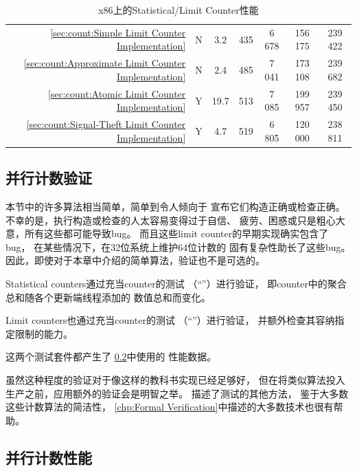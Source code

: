 \begin{table}
{\begin{tabular}{lrcS[table-format=2.1]S[table-format=3.0]S[table-format=4.0]
		  S[table-format=6.0]S[table-format=6.0]}
	 & \ref{sec:count:Simple Limit Counter Implementation} &
		N &  3.2 & 435 & 6 678 & 156 175 & 239 422 \\
	 & \ref{sec:count:Approximate Limit Counter Implementation} &
		N &  2.4 & 485 & 7 041 & 173 108 & 239 682 \\
	 & \ref{sec:count:Atomic Limit Counter Implementation} &
		Y & 19.7 & 513 & 7 085 & 199 957 & 239 450 \\
	 & \ref{sec:count:Signal-Theft Limit Counter Implementation} &
		Y &  4.7 & 519 & 6 805 & 120 000 & 238 811 \\
	\bottomrule
\end{tabular}
}
\caption{x86上的Statistical/Limit Counter性能}
\label{tab:count:Statistical/Limit Counter Performance on x86}
\end{table}

\subsection{并行计数验证}
\label{sec:count:Parallel Counting Validation}

本节中的许多算法相当简单，简单到令人倾向于
宣布它们构造正确或检查正确。
不幸的是，执行构造或检查的人太容易变得过于自信、
疲劳、困惑或只是粗心大意，所有这些都可能导致bug。
而且这些limit counter的早期实现确实包含了bug，
在某些情况下，在32位系统上维护64位计数的
固有复杂性助长了这些bug。
因此，即使对于本章中介绍的简单算法，验证也不是可选的。

Statistical counters通过充当counter的测试
（``''）进行验证，
即counter中的聚合总和随各个更新端线程添加的
数值总和而变化。

Limit counters也通过充当counter的测试
（``''）进行验证，
并额外检查其容纳指定限制的能力。

这两个测试套件都产生了
\cref{sec:count:Parallel Counting Performance}中使用的
性能数据。

虽然这种程度的验证对于像这样的教科书实现已经足够好，
但在将类似算法投入生产之前，应用额外的验证会是明智之举。
描述了测试的其他方法，
鉴于大多数这些计数算法的简洁性，
\cref{chp:Formal Verification}中描述的大多数技术也很有帮助。

\subsection{并行计数性能}
\label{sec:count:Parallel Counting Performance}

